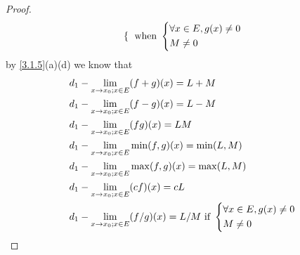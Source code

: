 \begin{proof}
\begin{align*}
\begin{dcases}
                                                       \end{dcases} \text{ when } \begin{dcases}
                                                                                    \forall x \in E, g(x) \neq 0 \\
                                                                                    M \neq 0
                                                                                  \end{dcases}
  \end{align*}
  by \cref{3.1.5}(a)(d) we know that
  \begin{align*}
     & d_1 - \lim_{x \to x_0 ; x \in E} (f + g)(x) = L + M                                          \\
     & d_1 - \lim_{x \to x_0 ; x \in E} (f - g)(x) = L - M                                          \\
     & d_1 - \lim_{x \to x_0 ; x \in E} (fg)(x) = LM                                                \\
     & d_1 - \lim_{x \to x_0 ; x \in E} \min(f, g)(x) = \min(L, M)                                  \\
     & d_1 - \lim_{x \to x_0 ; x \in E} \max(f, g)(x) = \max(L, M)                                  \\
     & d_1 - \lim_{x \to x_0 ; x \in E} (cf)(x) = cL                                                \\
     & d_1 - \lim_{x \to x_0 ; x \in E} (f / g)(x) = L / M \text{ if } \begin{dcases}
                                                                         \forall x \in E, g(x) \neq 0 \\
                                                                         M \neq 0
                                                                       \end{dcases}
  \end{align*}
\end{proof}
